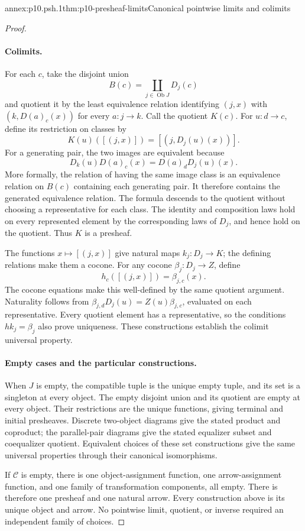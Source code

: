 \begin{annexitem}{annex:p10.psh.1}{thm:p10-presheaf-limits}{Canonical pointwise limits and colimits}
\begin{proof}
\paragraph{Colimits.}
For each \(c\), take the disjoint union
\[
                 B(c)=\coprod_{j\in\operatorname{Ob}J}D_j(c)
\]
and quotient it by the least equivalence relation identifying
\((j,x)\) with \((k,D(a)_c(x))\) for every \(a:j\to k\).
Call the quotient \(K(c)\).
For \(u:d\to c\), define its restriction on classes by
\[
                         K(u)([(j,x)])=[(j,D_j(u)(x))].
\]
For a generating pair, the two images are equivalent because
\[
                  D_k(u)D(a)_c(x)=D(a)_d D_j(u)(x).
\]
More formally, the relation of having the same image class
is an equivalence relation on \(B(c)\) containing each
generating pair.  It therefore contains the generated
equivalence relation.  The formula descends to the quotient
without choosing a representative for each class.
The identity and composition laws hold on every represented
element by the corresponding laws of \(D_j\), and hence
hold on the quotient.
Thus \(K\) is a presheaf.

The functions \(x\mapsto[(j,x)]\) give natural maps
\(k_j:D_j\to K\); the defining relations make them a cocone.
For any cocone \(\beta_j:D_j\to Z\), define
\[
                          h_c([(j,x)])=\beta_{j,c}(x).
\]
The cocone equations make this well-defined by the same
quotient argument.  Naturality follows from
\(\beta_{j,d}D_j(u)=Z(u)\beta_{j,c}\), evaluated on each
representative.
Every quotient element has a representative, so the
conditions \(h k_j=\beta_j\) also prove uniqueness.
These constructions establish the colimit universal property.

\paragraph{Empty cases and the particular constructions.}
When \(J\) is empty, the compatible tuple is the unique
empty tuple, and its set is a singleton at every object.
The empty disjoint union and its quotient are empty at
every object.  Their restrictions are the unique functions,
giving terminal and initial presheaves.
Discrete two-object diagrams give the stated product and
coproduct; the parallel-pair diagrams give the stated
equalizer subset and coequalizer quotient.
Equivalent choices of these set constructions give the
same universal properties through their canonical isomorphisms.

If \(\mathcal C\) is empty, there is one object-assignment
function, one arrow-assignment function, and one family of
transformation components, all empty.
There is therefore one presheaf and one natural arrow.
Every construction above is its unique object and arrow.
No pointwise limit, quotient, or inverse required an
independent family of choices.
\end{proof}
\end{annexitem}


